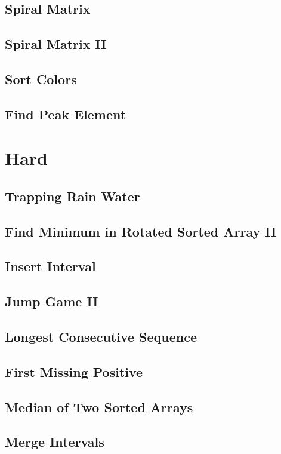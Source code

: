 \documentclass[12pt]{book}
\begin{document}
\subsection{Spiral Matrix}
\label{sec-1-2-29}
\subsection{Spiral Matrix II}
\label{sec-1-2-30}
\subsection{Sort Colors}
\label{sec-1-2-31}
\subsection{Find Peak Element}
\label{sec-1-2-32}
\section{Hard}
\label{sec-1-3}
\subsection{Trapping Rain Water}
\label{sec-1-3-1}
\subsection{Find Minimum in Rotated Sorted Array II}
\label{sec-1-3-2}
\subsection{Insert Interval}
\label{sec-1-3-3}
\subsection{Jump Game II}
\label{sec-1-3-4}
\subsection{Longest Consecutive Sequence}
\label{sec-1-3-5}
\subsection{First Missing Positive}
\label{sec-1-3-6}
\subsection{Median of Two Sorted Arrays}
\label{sec-1-3-7}
\subsection{Merge Intervals}
\label{sec-1-3-8}
\end{document}
